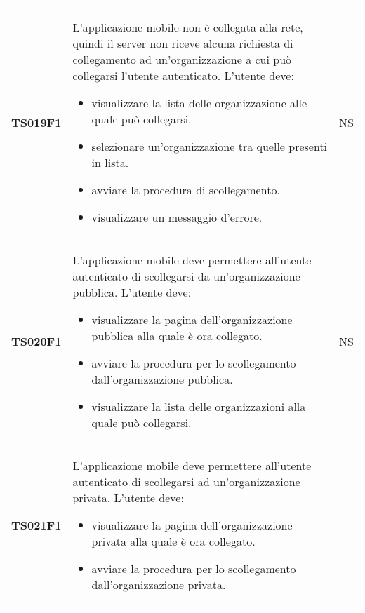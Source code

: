 \documentclass[../piano-di-qualifica.tex]{subfiles}
\begin{document}
\begin{longtable}[H]{>{\centering\bfseries}m{3cm} >{}m{10cm} >{\centering\arraybackslash}m{3cm}}
  TS019F1            & L'applicazione mobile non è collegata alla rete, quindi il server non riceve alcuna richiesta di collegamento ad un'organizzazione a cui può collegarsi l'utente autenticato. \newline
  L'utente deve:
  \begin{itemize}
    \item visualizzare la lista delle organizzazione alle quale può collegarsi.
    \item selezionare un'organizzazione tra quelle presenti in lista.
    \item avviare la procedura di scollegamento.
    \item visualizzare un messaggio d'errore.
  \end{itemize}
                     & NS                                                                                                                                                                                                                                                               \\
  TS020F1            & L'applicazione mobile deve permettere all'utente autenticato di scollegarsi da un'organizzazione pubblica. \newline
  L'utente deve:
  \begin{itemize}
    \item visualizzare la pagina dell'organizzazione pubblica alla quale è ora collegato.
    \item avviare la procedura per lo scollegamento dall'organizzazione pubblica.
    \item visualizzare la lista delle organizzazioni alla quale può collegarsi.
  \end{itemize}
                     & NS                                                                                                                                                                                                                                                               \\
  TS021F1            & L'applicazione mobile deve permettere all'utente autenticato di scollegarsi ad un'organizzazione privata. \newline
  L'utente deve:
  \begin{itemize}
    \item visualizzare la pagina dell'organizzazione privata alla quale è ora collegato.
    \item avviare la procedura per lo scollegamento dall'organizzazione privata.

\end{itemize}
\end{longtable}
\end{document}
